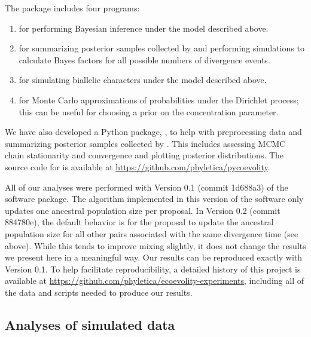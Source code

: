 The \ecoevolity package includes four programs:
\begin{enumerate}
    \item \ecoevolity for performing Bayesian inference under the
        model described above.
    \item \sumcoevolity for summarizing posterior samples collected by
        \ecoevolity and performing simulations to calculate Bayes factors for
        all possible numbers of divergence events.
    \item \simcoevolity for simulating biallelic characters under the model
        described above.
    \item \dpprobs for Monte Carlo approximations of probabilities under the
        Dirichlet process; this can be useful for choosing a prior on the
        concentration parameter.
\end{enumerate}
We have also developed a Python package, \pycoevolity, to help with
preprocessing data and summarizing posterior samples collected by \ecoevolity.
This includes assessing MCMC chain stationarity and convergence and plotting
posterior distributions.
The source code for \pycoevolity is available at
\url{https://github.com/phyletica/pycoevolity}.

All of our analyses were performed with
Version 0.1 
(commit 1d688a3)
of the \ecoevolity software package.
The \timerootsizemixer algorithm implemented in this version of the software
only updates one ancestral population size per proposal.
In Version 0.2 (commit 884780e), the default behavior is for the
\timerootsizemixer proposal to update the ancestral population size for all
other pairs associated with the same divergence time (see above).
While this tends to improve mixing slightly, it does not change the results we
present here in a meaningful way.
Our results can be reproduced exactly with Version 0.1.
To help facilitate reproducibility, a detailed history of this
project is available at
\url{https://github.com/phyletica/ecoevolity-experiments},
including all of the data and scripts needed to produce our results.


\subsection{Analyses of simulated data}

